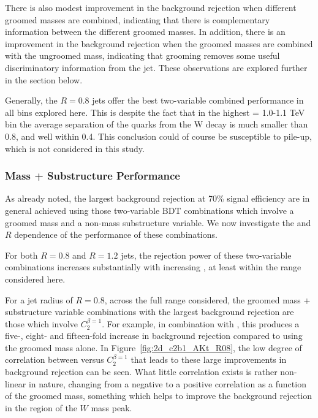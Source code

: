 
There is also modest improvement in
the background rejection when different groomed masses are combined,
 indicating that there is complementary information between the
different groomed masses. In addition, there is an improvement in the
background rejection when the groomed masses are combined with the
ungroomed mass, indicating that grooming removes some useful
discriminatory information from the jet. These observations are
explored further in the section below.

Generally, the $R=0.8$ jets offer the best two-variable
combined performance in all \pT bins explored here. This is despite
the fact that in the highest \pT = 1.0-1.1 TeV bin the average
separation of the quarks from the W decay is much smaller than 0.8,
and well within 0.4. This conclusion could of course be susceptible to
pile-up, which is not considered in this study.

\subsubsection{Mass + Substructure Performance}

As already noted, the largest background rejection at 70\% signal
efficiency are in general achieved using those two-variable BDT combinations
which involve a groomed mass and a non-mass substructure variable. We now investigate
the \pT and $R$ dependence of the performance of these combinations.

For both $R=0.8$ and $R=1.2$ jets, the rejection power of these two-variable
combinations increases substantially with increasing \pT, at least
within the \pT range considered here.

For a jet radius of $R=0.8$, across the full \pT range considered, the
groomed mass + substructure variable combinations with the
largest background rejection are those which
involve $C_2^{\beta=1}$. For example, in combination with
\msd, this produces a five-, eight- and fifteen-fold
increase in background rejection compared to using the groomed mass
alone. In Figure~\ref{fig:2d_c2b1_AKt_R08}, the low degree of
correlation between \msd versus $C_2^{\beta=1}$ that
leads to these large improvements in background rejection can be
seen. What little correlation exists is rather
non-linear in nature, changing from a negative to a positive
correlation as a function of the groomed mass, something which helps
to improve the background rejection in the region of the $W$ mass peak.


